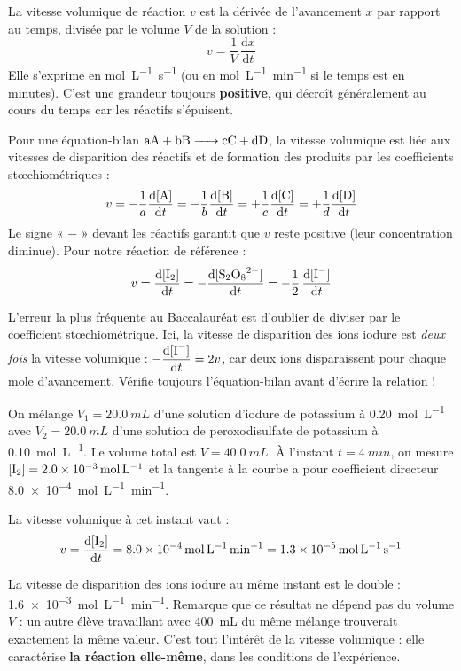 \documentclass[11pt]{article}
\newcommand{\cle}[1]{{\popxbold\color{popdark}#1}}
\begin{document}
\begin{definition}
La \cle{vitesse volumique de réaction} $v$ est la dérivée de l'avancement $x$ par rapport au temps, divisée par le volume $V$ de la solution :
\[ v = \frac{1}{V}\,\frac{\mathrm{d}x}{\mathrm{d}t} \]
Elle s'exprime en \si{mol.L^{-1}.s^{-1}} (ou en \si{mol.L^{-1}.min^{-1}} si le temps est en minutes). C'est une grandeur toujours \textbf{positive}, qui décroît généralement au cours du temps car les réactifs s'épuisent.
\end{definition}

\begin{aretenir}
Pour une équation-bilan $\ce{aA + bB -> cC + dD}$, la vitesse volumique est liée aux vitesses de disparition des réactifs et de formation des produits par les coefficients stœchiométriques :
\[ v = -\frac{1}{a}\frac{\mathrm{d}[\ce{A}]}{\mathrm{d}t} = -\frac{1}{b}\frac{\mathrm{d}[\ce{B}]}{\mathrm{d}t} = +\frac{1}{c}\frac{\mathrm{d}[\ce{C}]}{\mathrm{d}t} = +\frac{1}{d}\frac{\mathrm{d}[\ce{D}]}{\mathrm{d}t} \]
Le signe « $-$ » devant les réactifs garantit que $v$ reste positive (leur concentration diminue). Pour notre réaction de référence :
\[ v = \frac{\mathrm{d}[\ce{I2}]}{\mathrm{d}t} = -\frac{\mathrm{d}[\ce{S2O8^2-}]}{\mathrm{d}t} = -\frac{1}{2}\,\frac{\mathrm{d}[\ce{I-}]}{\mathrm{d}t} \]
\end{aretenir}

\begin{attention}
L'erreur la plus fréquente au Baccalauréat est d'oublier de diviser par le coefficient stœchiométrique. Ici, la vitesse de disparition des ions iodure est \emph{deux fois} la vitesse volumique : $-\dfrac{\mathrm{d}[\ce{I-}]}{\mathrm{d}t} = 2v$, car deux ions  disparaissent pour chaque mole d'avancement. Vérifie toujours l'équation-bilan avant d'écrire la relation !
\end{attention}

\begin{exemplebox}
On mélange $V_1 = \SI{20,0}{mL}$ d'une solution d'iodure de potassium à \SI{0,20}{mol.L^{-1}} avec $V_2 = \SI{20,0}{mL}$ d'une solution de peroxodisulfate de potassium à \SI{0,10}{mol.L^{-1}}. Le volume total est $V = \SI{40,0}{mL}$. À l'instant $t = \SI{4}{min}$, on mesure $[\ce{I2}] = \SI{2,0e-3}{mol.L^{-1}}$ et la tangente à la courbe a pour coefficient directeur \SI{8,0e-4}{mol.L^{-1}.min^{-1}}.

La vitesse volumique à cet instant vaut :
\[ v = \frac{\mathrm{d}[\ce{I2}]}{\mathrm{d}t} = \SI{8,0e-4}{mol.L^{-1}.min^{-1}} = \SI{1,3e-5}{mol.L^{-1}.s^{-1}} \]

La vitesse de disparition des ions iodure au même instant est le double : \SI{1,6e-3}{mol.L^{-1}.min^{-1}}. Remarque que ce résultat ne dépend pas du volume $V$ : un autre élève travaillant avec \SI{400}{mL} du même mélange trouverait exactement la même valeur. C'est tout l'intérêt de la vitesse volumique : elle caractérise \textbf{la réaction elle-même}, dans les conditions de l'expérience.
\end{exemplebox}
\end{document}
